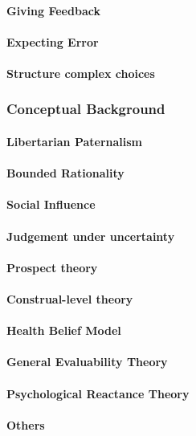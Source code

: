 \paragraph{Giving Feedback}
\paragraph{Expecting Error}
\paragraph{Structure complex choices}

\subsubsection{Conceptual Background}
\paragraph{Libertarian Paternalism}
\paragraph{Bounded Rationality}
\paragraph{Social Influence}
\paragraph{Judgement under uncertainty}
\paragraph{Prospect theory}
\paragraph{Construal-level theory}
\paragraph{Health Belief Model}
\paragraph{General Evaluability Theory}
\paragraph{Psychological Reactance Theory}
\paragraph{Others}

